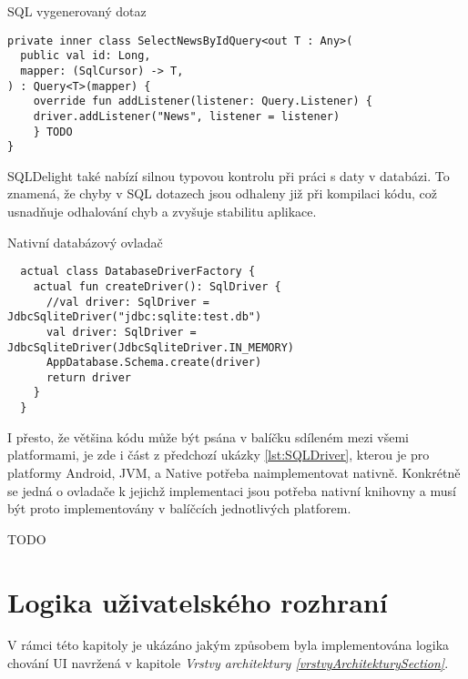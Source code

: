 \begin{listing}[H]
\caption{SQL vygenerovaný dotaz}\label{lst:SQLGeneratedDotaz}
\begin{verbatim}
private inner class SelectNewsByIdQuery<out T : Any>(
  public val id: Long,
  mapper: (SqlCursor) -> T,
) : Query<T>(mapper) {
    override fun addListener(listener: Query.Listener) {
    driver.addListener("News", listener = listener)
    } TODO
}
\end{verbatim}
\end{listing}

SQLDelight také nabízí silnou typovou kontrolu při práci s daty v databázi. To znamená, že chyby v SQL dotazech jsou odhaleny již při
 kompilaci kódu, což usnadňuje odhalování chyb a zvyšuje stabilitu aplikace.

\begin{listing}[H]
\caption{Nativní databázový ovladač}\label{lst:DatabaseDriverFactory}
\begin{verbatim}
  actual class DatabaseDriverFactory {
    actual fun createDriver(): SqlDriver {
      //val driver: SqlDriver = JdbcSqliteDriver("jdbc:sqlite:test.db")
      val driver: SqlDriver = JdbcSqliteDriver(JdbcSqliteDriver.IN_MEMORY)
      AppDatabase.Schema.create(driver)
      return driver
    }
  }
\end{verbatim}
\end{listing}

I přesto, že většina kódu může být psána v balíčku sdíleném mezi všemi platformami, je zde i část z předchozí ukázky \ref{lst:SQLDriver},
kterou je pro platformy Android, JVM, a Native potřeba naimplementovat nativně. Konkrétně se jedná o ovladače k jejichž implementaci jsou 
potřeba nativní knihovny a musí být proto implementovány v balíčcích jednotlivých platforem.

TODO




\section{Logika uživatelského rozhraní} \label{UILayerImpl}
V rámci této kapitoly je ukázáno jakým způsobem byla implementována logika chování UI navržená v kapitole 
\textit{Vrstvy architektury \ref{vrstvyArchitekturySection}}.


